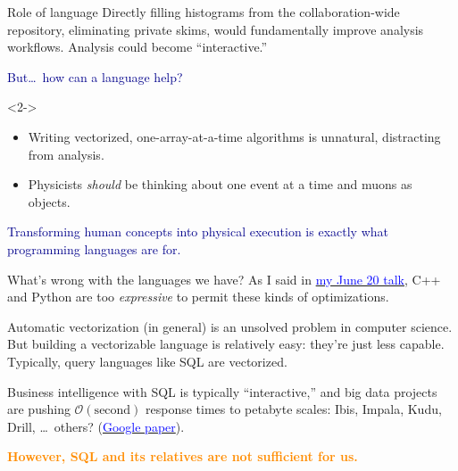 \documentclass{beamer}
\begin{document}
\begin{frame}{Role of language}
\vspace{0.5 cm}
Directly filling histograms from the collaboration-wide repository, eliminating private skims, would fundamentally improve analysis workflows. Analysis could become ``interactive.''

\vspace{0.5 cm}
\textcolor{darkblue}{But\ldots\ how can a language help?}

\begin{uncoverenv}<2->
\vspace{0.3 cm}
\begin{itemize}
\item Writing vectorized, one-array-at-a-time algorithms is unnatural, distracting from analysis.
\item Physicists {\it should} be thinking about one event at a time and muons as objects.
\end{itemize}

\vspace{0.3 cm}
\textcolor{darkblue}{Transforming human concepts into physical execution is exactly what programming languages are for.}
\end{uncoverenv}
\end{frame}

\begin{frame}{What's wrong with the languages we have?}
\vspace{0.25 cm}
As I said in \href{https://indico.cern.ch/event/544650/}{\textcolor{blue}{my June 20 talk}}, C++ and Python are too {\it expressive} to permit these kinds of optimizations.

\vspace{0.5 cm}
Automatic vectorization (in general) is an unsolved problem in computer science. But building a vectorizable language is relatively easy: they're just less capable. Typically, query languages like SQL are vectorized.

\vspace{0.5 cm}
Business intelligence with SQL is typically ``interactive,'' and big data projects are pushing $\mathcal{O}(\mbox{second})$ response times to petabyte scales: Ibis, Impala, Kudu, Drill, \ldots\ others? (\href{http://research.google.com/pubs/pub36632.html}{\textcolor{blue}{Google paper}}).

\vspace{0.5 cm}
\textcolor{darkorange}{\bf However, SQL and its relatives are not sufficient for us.}
\end{frame}
\end{document}
